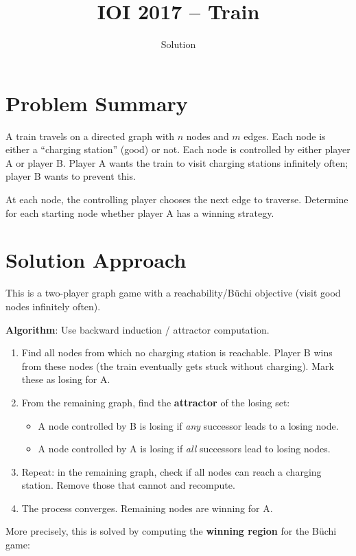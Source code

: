 \documentclass[11pt,a4paper]{article}
\title{IOI 2017 -- Train}
\author{Solution}
\date{}
\begin{document}
\maketitle

\section{Problem Summary}

A train travels on a directed graph with $n$ nodes and $m$ edges. Each node is either a ``charging station'' (good) or not. Each node is controlled by either player A or player B. Player A wants the train to visit charging stations infinitely often; player B wants to prevent this.

At each node, the controlling player chooses the next edge to traverse. Determine for each starting node whether player A has a winning strategy.

\section{Solution Approach}

This is a two-player graph game with a reachability/B\"uchi objective (visit good nodes infinitely often).

\textbf{Algorithm}: Use backward induction / attractor computation.

\begin{enumerate}
  \item Find all nodes from which no charging station is reachable. Player B wins from these nodes (the train eventually gets stuck without charging). Mark these as losing for A.
  \item From the remaining graph, find the \textbf{attractor} of the losing set:
    \begin{itemize}
      \item A node controlled by B is losing if \emph{any} successor leads to a losing node.
      \item A node controlled by A is losing if \emph{all} successors lead to losing nodes.
    \end{itemize}
  \item Repeat: in the remaining graph, check if all nodes can reach a charging station. Remove those that cannot and recompute.
  \item The process converges. Remaining nodes are winning for A.
\end{enumerate}

More precisely, this is solved by computing the \textbf{winning region} for the B\"uchi game:
\end{document}
